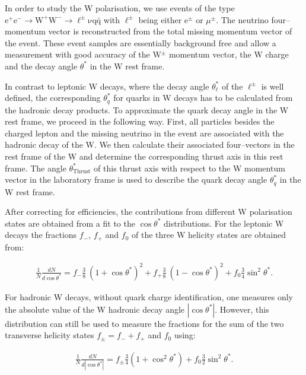 \documentclass[12pt,a4paper,dvips]{article}
\begin{document}
In order to study the W polarisation, we use events of the type 
$\mathrm{e^{+}e^{-} \rightarrow W^{+}W^{-} \rightarrow 
\ell^{\pm} \nu q \bar{q}}$
with $\mathrm{\ell}^{\pm}$ being either e$^{\pm}$ or $\mu^{\pm}$. The neutrino 
four--momentum vector is reconstructed from the 
total missing momentum vector of the event.
These event samples are essentially background free and allow a measurement 
with good accuracy of the W$^{\pm}$ momentum vector, the W charge and the 
decay angle $\theta^{*}$ in the W rest frame.

In contrast to leptonic W decays, where 
the decay angle $\theta^{*}_{\ell}$ of the $\ell^{\pm}$
is well defined, the corresponding $\theta^{*}_{q}$ for quarks  
in W decays has to be calculated from the hadronic decay products. 
To approximate the quark decay angle in the W rest frame, we proceed 
in the following way. First,  
all particles besides the charged lepton and the missing neutrino 
in the event are associated with the hadronic decay of the W. 
We then calculate their associated four--vectors
in the rest frame of the W and determine the corresponding   
thrust axis in this rest frame. The angle $\theta^{*}_{\mathrm{Thrust}}$
of this thrust axis
with respect to the W momentum vector in the laboratory frame is 
used to describe the quark decay angle $\theta^{*}_{q}$ in the W 
rest frame. 

After correcting for efficiencies, the contributions from 
different W polarisation states are  
obtained from a fit to the $\cos \theta^{*}$ distributions. 
For the leptonic W decays the fractions $f_{-}$, $f_{+}$ and 
$f_{0}$ of the three W helicity states are 
obtained from:  

\begin{eqnarray}
\frac{1}{N}\frac{dN}{d\cos\theta^{*}} = f_{-}  
\frac{3}{8}~(1+\cos\theta^{*})^{2} + 
f_{+} \frac{3}{8}~(1-\cos\theta^{*})^{2} + f_{0} 
\frac{3}{4} \sin^{2} \theta^{*}.
\end{eqnarray}

For hadronic W decays, without quark charge identification,
one measures only the absolute value of the W hadronic decay angle 
$|\cos \theta^{*}|$. However, 
this distribution can still be used  
to measure the fractions for the sum of the two transverse helicity 
states $f_{\pm}= f_{-} + f_{+}$ and  
$f_{0}$ using: 

\begin{eqnarray}
\frac{1}{N}\frac{dN}{d|\cos\theta^{*}|} = f_{\pm}  
\frac{3}{4} (1+\cos^{2}\theta^{*}) 
+ f_{0}  \frac{3}{2} \sin^{2} \theta^{*}.
\end{eqnarray}
\end{document}
